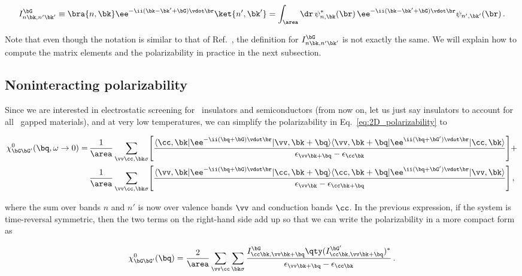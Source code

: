 \begin{equation}
\label{eq:2D_plane_wave_matrix_element}
    I^{\bG}_{n \bk, n' \bk'} \equiv \bra{n,\bk} \ee^{-\ii (\bk - \bk' + \bG) \vdot \br} \ket{n',\bk'} = \int_{\area} \dr\, \psi^*_{n,\bk} (\br) \, \ee^{-\ii(\bk  - \bk' + \bG) \vdot \br} \psi_{n', \bk'} (\br)\,.
\end{equation}

\noindent Note that even though the notation is similar to that of Ref.~\cite{Xatu}, the definition for $I^{\bG}_{n \bk, n' \bk'}$ is not exactly the same.
We will explain how to compute the matrix elements and the polarizability in practice in the next subsection.

\subsection{Noninteracting polarizability}
\label{subsec:non_interacting_polarizability}

Since we are interested in electrostatic screening for \bd~insulators and semiconductors (from now on, let us just say insulators to account for all \bd~gapped materials), and at very low temperatures, we can simplify the polarizability in Eq.~\eqref{eq:2D_polarizability} to

\begin{equation}
    \label{eq:static_polarizability_repeated}
    \begin{aligned}
        \chi^0_{\bG\bG'}(\bq,\omega \to 0) = & \, \frac{1}{\area} \sum_{\vv \cc,\bk \sigma}\! \Bigg[\frac{\langle \cc,\bk| \ee^{-\ii(\bq+\bG)\vdot\br}|\vv,\bk+\bq\rangle \langle \vv,\bk+\bq| \ee^{\ii(\bq+\bG')\vdot\br}|\cc,\bk\rangle}{\epsilon_{\vv \bk+\bq}-\epsilon_{\cc \bk}} \Bigg] + \\
        & \, \frac{1}{\area} \sum_{\vv \cc,\bk \sigma} \! \Bigg[\frac{\langle \vv,\bk| \ee^{-\ii(\bq+\bG)\vdot\br}|\cc,\bk+\bq\rangle\langle \cc,\bk+\bq| \ee^{\ii(\bq+\bG')\vdot\br}|\vv,\bk\rangle}{\epsilon_{\vv \bk} - \epsilon_{\cc \bk+\bq}}\Bigg] \,,
    \end{aligned}
\end{equation}

\noindent where the sum over bands $n$ and $n'$ is now over valence bands $\vv$ and conduction bands $\cc$.
In the previous expression, if the system is time-reversal symmetric, then the two terms on the right-hand side add up so that we can write the polarizability in a more compact form as

\begin{equation}
    \label{eq:static_polarizability_TRS}
    \chi^0_{\bG \bG'} (\bq) = \frac{2}{\area} \sum_{\vv \cc}  \sum_{\bk \sigma} \frac{I^{\bG}_{\cc \bk, \vv \bk + \bq}  \qty(I^{\bG'}_{\cc \bk, \vv \bk + \bq})^*}{\epsilon_{\vv \bk + \bq} - \epsilon_{\cc \bk} }\,.
\end{equation}

